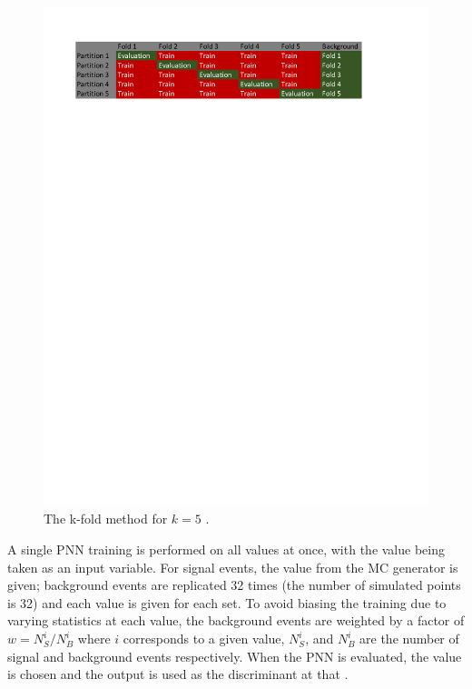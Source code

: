 			\begin{figure}	
				\begin{center}
					\includegraphics[width=.75\textwidth,keepaspectratio=true]{chapters/chapter6_HPlus/images/kFoldDiagram_noValid.pdf}
				\end{center}
				\caption{The k-fold method for $k=5$ \cite{Burghgrave:2018uwq}.}
				\label{fig:k-fold-diagram}
			\end{figure}	

			A single PNN training is performed on all \mHpm values at once, with the \mHpm value being taken as an input variable. For signal events, the \mHpm value from the MC generator is given; background events are replicated 32 times (the number of simulated \mHpm points is 32) and each \mHpm value is given for each set. To avoid biasing the training due to varying statistics at each \mHpm value, the background events are weighted by a factor of $w = N^{i}_{S}/N^{i}_{B}$ where $i$ corresponds to a given \mHpm value, $N^{i}_{S}$, and $N^{i}_{B}$ are the number of signal and background events respectively. When the PNN is evaluated, the \mHpm value is chosen and the output is used as the discriminant at that \mHpm.

